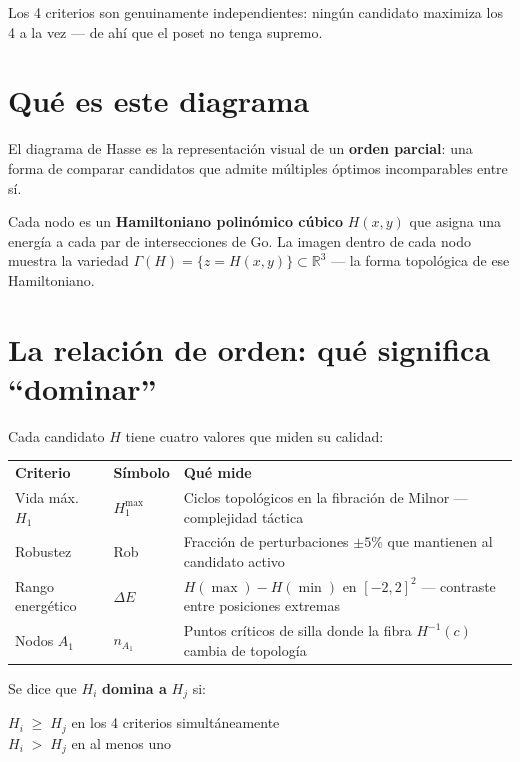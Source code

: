 \documentclass[11pt, a4paper]{article}
\newcommand{\TH}[1]{\cellcolor{cTHbg}\color{white}\textbf{#1}}
\begin{document}
Los 4 criterios son genuinamente independientes: ning\'un candidato maximiza
los 4 a la vez --- de ah\'i que el poset no tenga supremo.

\section{Qu\'e es este diagrama}

El diagrama de Hasse es la representaci\'on visual de un \textbf{orden
parcial}: una forma de comparar candidatos que admite m\'ultiples \'optimos
incomparables entre s\'i.

Cada nodo es un \textbf{Hamiltoniano polinómico cúbico} $H(x,y)$ que asigna
una energ\'ia a cada par de intersecciones de Go. La imagen dentro de cada
nodo muestra la variedad $\Gamma(H)=\{z=H(x,y)\}\subset\mathbb{R}^3$ ---
la forma topol\'ogica de ese Hamiltoniano.

\section{La relaci\'on de orden: qu\'e significa ``dominar''}

Cada candidato $H$ tiene cuatro valores que miden su calidad:

\medskip
\begin{center}
\begin{tabularx}{0.96\textwidth}{L{2.4cm}C{2cm}X}
  \TH{Criterio} & \TH{S\'imbolo} & \TH{Qu\'e mide} \\[1pt]
  Vida m\'ax.\ $H_1$ & $H_1^{\max}$
    & Ciclos topol\'ogicos en la fibraci\'on de Milnor --- complejidad t\'actica \\
  Robustez & Rob
    & Fracci\'on de perturbaciones $\pm5\%$ que mantienen al candidato activo \\
  Rango energ\'etico & $\Delta E$
    & $H(\max)-H(\min)$ en $[-2,2]^2$ --- contraste entre posiciones extremas \\
  Nodos $A_1$ & $n_{A_1}$
    & Puntos cr\'iticos de silla donde la fibra $H^{-1}(c)$ cambia de topolog\'ia \\
\end{tabularx}
\end{center}
\medskip

Se dice que $H_i$ \textbf{domina a} $H_j$ si:

\begin{tcolorbox}[codebox]
$H_i \;\geq\; H_j$ \quad en los 4 criterios simult\'aneamente\\[3pt]
$H_i \;>\; H_j$ \quad en al menos uno
\end{tcolorbox}
\end{document}
